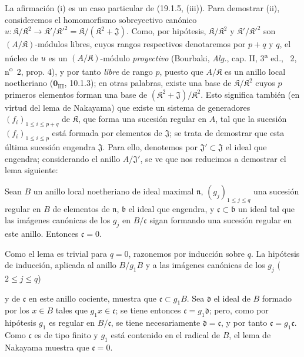 La afirmación (i) es un caso particular de (19.1.5, (iii)). Para demostrar (ii), consideremos el homomorfismo sobreyectivo canónico $u:\mathfrak K/\mathfrak K^2\to\mathfrak K'/\mathfrak K'^2=\mathfrak K/(\mathfrak K^2+\mathfrak J)$. Como, por hipótesis, $\mathfrak K/\mathfrak K^2$ y $\mathfrak K'/\mathfrak K'^2$ son $(A/\mathfrak K)$-módulos libres, cuyos rangos respectivos denotaremos por $p+q$ y $q$, el núcleo de $u$ es un $(A/\mathfrak K)$-módulo \emph{proyectivo} (Bourbaki, \emph{Alg.}, cap. II, 3\textsuperscript{a} ed., \textsection~2, n\textsuperscript{o}~2, prop. 4), y por tanto \emph{libre} de rango $p$, puesto que $A/\mathfrak K$ es un anillo local noetheriano ($\mathbf{0}_{\mathrm{III}}$, 10.1.3); en otras palabras, existe una base de $\mathfrak K/\mathfrak K^2$ cuyos $p$ primeros elementos forman una base de $(\mathfrak K^2+\mathfrak J)/\mathfrak K^2$. Esto significa también (en virtud del lema de Nakayama) que existe un sistema de generadores $(f_i)_{1\leq i\leq p+q}$ de $\mathfrak K$, que forma una sucesión regular en $A$, tal que la sucesión $(f_i)_{1\leq i\leq p}$ está formada por elementos de $\mathfrak J$; se trata de demostrar que esta última sucesión engendra $\mathfrak J$. Para ello, denotemos por $\mathfrak J'\subset\mathfrak J$ el ideal que engendra; considerando el anillo $A/\mathfrak J'$, se ve que nos reducimos a demostrar el lema siguiente:

\begin{lemma}[19.1.6.1]
\label{IV.19.1.6.1}
Sean $B$ un anillo local noetheriano de ideal maximal $\mathfrak n$, $(g_j)_{1\leq j\leq q}$ una sucesión regular en $B$ de elementos de $\mathfrak n$, $\mathfrak b$ el ideal que engendra, y $\mathfrak c\subset\mathfrak b$ un ideal tal que las imágenes canónicas de los $g_j$ en $B/\mathfrak c$ sigan formando una sucesión regular en este anillo. Entonces $\mathfrak c=0$.
\end{lemma}

Como el lema es trivial para $q=0$, razonemos por inducción sobre $q$. La hipótesis de inducción, aplicada al anillo $B/g_1B$ y a las imágenes canónicas de los $g_j$ ($2\leq j\leq q$)


y de $\mathfrak c$ en este anillo cociente, muestra que $\mathfrak c\subset g_1B$. Sea $\mathfrak d$ el ideal de $B$ formado por los $x\in B$ tales que $g_1x\in\mathfrak c$; se tiene entonces $\mathfrak c=g_1\mathfrak d$; pero, como por hipótesis $g_1$ es regular en $B/\mathfrak c$, se tiene necesariamente $\mathfrak d=\mathfrak c$, y por tanto $\mathfrak c=g_1\mathfrak c$. Como $\mathfrak c$ es de tipo finito y $g_1$ está contenido en el radical de $B$, el lema de Nakayama muestra que $\mathfrak c=0$.

